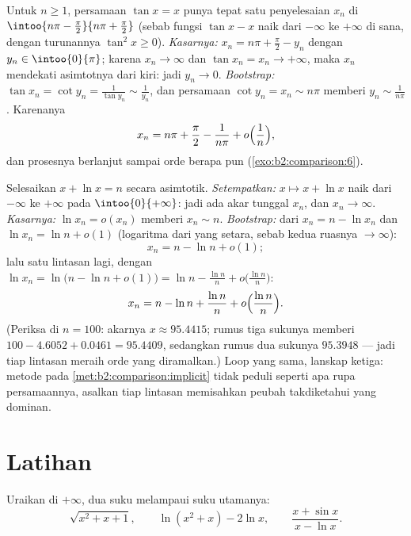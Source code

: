 \begin{example}\label{ex:b2:comparison:tan}
Untuk $n \geq 1$, persamaan $\tan x = x$ punya tepat satu penyelesaian
$x_n$ di $\intoo{n\pi - \frac\pi2}{n\pi + \frac\pi2}$ (sebab fungsi
$\tan x - x$ naik dari $-\infty$ ke $+\infty$ di sana, dengan
turunannya $\tan^2 x \geq 0$). \emph{Kasarnya:} $x_n = n\pi +
\frac\pi2 - y_n$ dengan $y_n \in \intoo{0}{\pi}$; karena $x_n \to
\infty$ dan $\tan x_n = x_n \to +\infty$, maka $x_n$ mendekati
asimtotnya dari kiri: jadi $y_n \to 0$. \emph{Bootstrap:} $\tan x_n =
\cot y_n = \frac{1}{\tan y_n} \sim \frac{1}{y_n}$, dan persamaan
$\cot y_n = x_n \sim n\pi$ memberi $y_n \sim \frac{1}{n\pi}$. Karenanya
\[
x_n = n\pi + \frac\pi2 - \frac{1}{n\pi} +
o\Bigl(\frac1n\Bigr),
\]
dan prosesnya berlanjut sampai orde berapa pun
(\cref{exo:b2:comparison:6}).
\end{example}

\begin{example}\label{ex:b2:comparison:xplusln}
Selesaikan $x + \ln x = n$ secara asimtotik. \emph{Setempatkan:} $x
\mapsto x + \ln x$ naik dari $-\infty$ ke $+\infty$ pada
$\intoo{0}{+\infty}$: jadi ada akar tunggal $x_n$, dan $x_n \to \infty$.
\emph{Kasarnya:} $\ln x_n = o(x_n)$ memberi $x_n \sim n$.
\emph{Bootstrap:} dari $x_n = n - \ln x_n$ dan $\ln x_n = \ln n
+ o(1)$ (logaritma dari yang setara, sebab kedua ruasnya $\to \infty$):
\[
x_n = n - \ln n + o(1) ;
\]
lalu satu lintasan lagi, dengan $\ln x_n = \ln\bigl(n - \ln n + o(1)\bigr) =
\ln n - \frac{\ln n}{n} + o\bigl(\frac{\ln n}n\bigr)$:
\[
x_n = n - \ln n + \frac{\ln n}{n} +
o\Bigl(\frac{\ln n}{n}\Bigr).
\]
(Periksa di $n = 100$: akarnya $x \approx 95.4415$; rumus tiga
sukunya memberi $100 - 4.6052 + 0.0461 = 95.4409$, sedangkan
rumus dua sukunya $95.3948$ --- jadi tiap lintasan meraih orde yang
diramalkan.) Loop yang sama, lanskap ketiga: metode pada
\cref{met:b2:comparison:implicit} tidak peduli seperti apa rupa
persamaannya, asalkan tiap lintasan memisahkan peubah takdiketahui yang
dominan.
\end{example}

\section{Latihan}

\begin{exercise}[$\star$]\label{exo:b2:comparison:1}
Uraikan di $+\infty$, dua suku melampaui suku utamanya:
\[
\sqrt{x^2 + x + 1} ,
\qquad
\ln(x^2 + x) - 2\ln x,
\qquad
\frac{x + \sin x}{x - \ln x} .
\]
\end{exercise}

